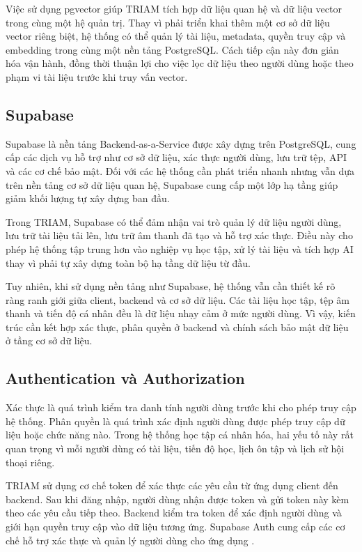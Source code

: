 \documentclass[12pt,a4paper]{report}
\begin{document}
Việc sử dụng pgvector giúp TRIAM tích hợp dữ liệu quan hệ và dữ liệu vector trong cùng một hệ quản trị. Thay vì phải triển khai thêm một cơ sở dữ liệu vector riêng biệt, hệ thống có thể quản lý tài liệu, metadata, quyền truy cập và embedding trong cùng một nền tảng PostgreSQL. Cách tiếp cận này đơn giản hóa vận hành, đồng thời thuận lợi cho việc lọc dữ liệu theo người dùng hoặc theo phạm vi tài liệu trước khi truy vấn vector.

\subsection{Supabase}

Supabase là nền tảng Backend-as-a-Service được xây dựng trên PostgreSQL, cung cấp các dịch vụ hỗ trợ như cơ sở dữ liệu, xác thực người dùng, lưu trữ tệp, API và các cơ chế bảo mật. Đối với các hệ thống cần phát triển nhanh nhưng vẫn dựa trên nền tảng cơ sở dữ liệu quan hệ, Supabase cung cấp một lớp hạ tầng giúp giảm khối lượng tự xây dựng ban đầu.

Trong TRIAM, Supabase có thể đảm nhận vai trò quản lý dữ liệu người dùng, lưu trữ tài liệu tải lên, lưu trữ âm thanh đã tạo và hỗ trợ xác thực. Điều này cho phép hệ thống tập trung hơn vào nghiệp vụ học tập, xử lý tài liệu và tích hợp AI thay vì phải tự xây dựng toàn bộ hạ tầng dữ liệu từ đầu.

Tuy nhiên, khi sử dụng nền tảng như Supabase, hệ thống vẫn cần thiết kế rõ ràng ranh giới giữa client, backend và cơ sở dữ liệu. Các tài liệu học tập, tệp âm thanh và tiến độ cá nhân đều là dữ liệu nhạy cảm ở mức người dùng. Vì vậy, kiến trúc cần kết hợp xác thực, phân quyền ở backend và chính sách bảo mật dữ liệu ở tầng cơ sở dữ liệu.

\subsection{Authentication và Authorization}

Xác thực là quá trình kiểm tra danh tính người dùng trước khi cho phép truy cập hệ thống. Phân quyền là quá trình xác định người dùng được phép truy cập dữ liệu hoặc chức năng nào. Trong hệ thống học tập cá nhân hóa, hai yếu tố này rất quan trọng vì mỗi người dùng có tài liệu, tiến độ học, lịch ôn tập và lịch sử hội thoại riêng.

TRIAM sử dụng cơ chế token để xác thực các yêu cầu từ ứng dụng client đến backend. Sau khi đăng nhập, người dùng nhận được token và gửi token này kèm theo các yêu cầu tiếp theo. Backend kiểm tra token để xác định người dùng và giới hạn quyền truy cập vào dữ liệu tương ứng. Supabase Auth cung cấp các cơ chế hỗ trợ xác thực và quản lý người dùng cho ứng dụng \cite{supabaseAuthDocs}.
\end{document}
